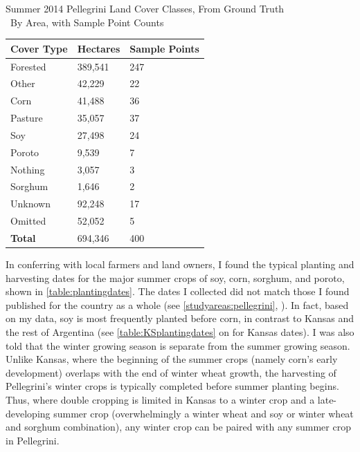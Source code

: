 \begin{sstable}
  \centering
  \caption[Summer 2014 Pellegrini Land Cover Classes, From Ground Truth]{Summer 2014 Pellegrini Land Cover Classes, From Ground Truth\\~By Area, with Sample Point Counts}
  \label{table:pellegrini:LCarea}
  \begin{tabu}{XX[r]X[r]}
    \toprule
    \textbf{Cover Type} & \textbf{Hectares} & \textbf{Sample Points} \\
    \midrule
    Forested & 389,541 & 247 \\
    Other & 42,229 & 22 \\
    Corn & 41,488 & 36 \\
    Pasture & 35,057 & 37 \\
    Soy & 27,498 & 24 \\
    Poroto & 9,539 & 7 \\
    Nothing & 3,057 & 3 \\
    Sorghum & 1,646 & 2 \\
    \midrule
    Unknown & 92,248 & 17 \\
    Omitted & 52,052 & 5 \\
    \midrule
    \textbf{Total} & 694,346 & 400 \\
    \bottomrule
  \end{tabu}
\end{sstable}

In conferring with local farmers and land owners, I found the typical planting and harvesting dates for the major summer crops of soy, corn, sorghum, and poroto, shown in \autoref{table:plantingdates}. The dates I collected did not match those I found published for the country as a whole (see \autoref{studyareas:pellegrini}, ). In fact, based on my data, soy is most frequently planted before corn, in contrast to Kansas and the rest of Argentina (see \autoref{table:KSplantingdates} on  for Kansas dates). I was also told that the winter growing season is separate from the summer growing season. Unlike Kansas, where the beginning of the summer crops (namely corn's early development) overlaps with the end of winter wheat growth, the harvesting of Pellegrini's winter crops is typically completed before summer planting begins. Thus, where double cropping is limited in Kansas to a winter crop and a late-developing summer crop (overwhelmingly a winter wheat and soy or winter wheat and sorghum combination), any winter crop can be paired with any summer crop in Pellegrini.

